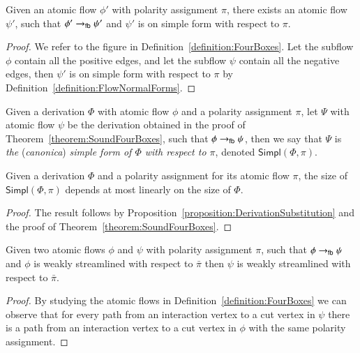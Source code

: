 \begin{lemma}\label{lemma:FourBoxesSimpleForm}
Given an atomic flow $\phi'$ with polarity assignment $\pi$, there exists an atomic flow $\psi'$, such that $\phi'\to_{\mathsf{fb}}\psi'$ and $\psi'$ is on simple form with respect to $\pi$.
\end{lemma}

\begin{proof}
We refer to the figure in Definition~\vref{definition:FourBoxes}. Let the subflow $\phi$ contain all the positive edges, and let the subflow $\psi$ contain all the negative edges, then $\psi'$ is on simple form with respect to $\pi$ by Definition~\vref{definition:FlowNormalForms}.
\end{proof}

\newcommand{\Simpl}{\mathsf{Simpl}}
\begin{definition}\label{definition:DerSimpleForm}
Given a derivation $\Phi$ with atomic flow $\phi$ and a polarity assignment $\pi$, let $\Psi$ with atomic flow $\psi$ be the derivation obtained in the proof of Theorem~\ref{theorem:SoundFourBoxes}, such that $\phi\to_{\mathsf{fb}}\psi$, then we say that $\Psi$ is \emph{the} (\emph{canonica}) \emph{simple form of\/ $\Phi$ with respect to $\pi$}, denoted $\Simpl(\Phi,\pi)$.
\end{definition}

\begin{lemma}\label{lemma:SizeFourBoxes}
Given a derivation $\Phi$ and a polarity assignment for its atomic flow $\pi$, the size of $\Simpl(\Phi,\pi)$ depends at most linearly on the size of $\Phi$.
\end{lemma}

\begin{proof}
The result follows by Proposition~\vref{proposition:DerivationSubstitution} and the proof of Theorem~\vref{theorem:SoundFourBoxes}.
\end{proof}

\begin{lemma}\label{lemma:FourBoxesStreamlining}
Given two atomic flows $\phi$ and $\psi$ with polarity assignment $\pi$, such that $\phi\to_{\mathsf{fb}}\psi$ and $\phi$ is weakly streamlined with respect to $\bar\pi$ then $\psi$ is weakly streamlined with respect to $\bar\pi$.
\end{lemma}

\begin{proof}
By studying the atomic flows in Definition~\vref{definition:FourBoxes} we can observe that for every path from an interaction vertex to a cut vertex in $\psi$ there is a path from an interaction vertex to a cut vertex in $\phi$ with the same polarity assignment.
\end{proof}


